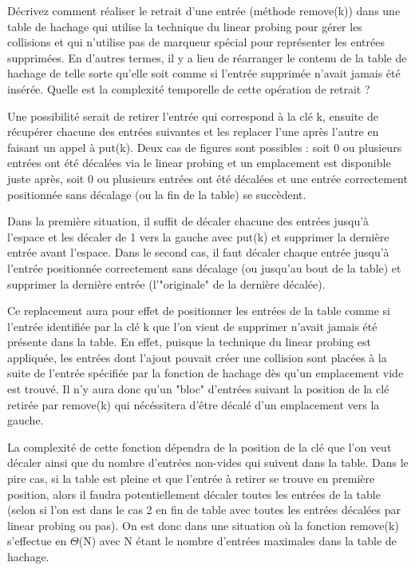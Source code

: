 Décrivez comment réaliser le retrait d’une entrée (méthode remove(k)) dans
une table de hachage qui utilise la technique du linear probing pour gérer les
collisions et qui n’utilise pas de marqueur spécial pour représenter les entrées
supprimées. En d’autres termes, il y a lieu de réarranger le contenu de la table de
hachage de telle sorte qu’elle soit comme si l’entrée supprimée n’avait jamais été
insérée. Quelle est la complexité temporelle de cette opération de retrait ?

Une possibilité serait de retirer l'entrée qui correspond à la clé k, ensuite de récupérer chacune des entrées suivantes et les replacer l'une après l'autre en faisant un appel à put(k).
Deux cas de figures sont possibles : soit 0 ou plusieurs entrées ont été décalées via le linear probing et un emplacement est disponible juste après, soit 0 ou plusieurs entrées ont été décalées et une entrée correctement positionnée sans décalage (ou la fin de la table) se succèdent.

Dans la première situation, il suffit de décaler chacune des entrées jusqu'à l'espace et les décaler de 1 vers la gauche avec put(k) et supprimer la dernière entrée avant l'espace. Dans le second cas, il faut décaler chaque entrée jusqu'à l'entrée positionnée correctement sans décalage (ou jusqu'au bout de la table) et supprimer la dernière entrée (l'"originale" de la dernière décalée).

Ce replacement aura pour effet de positionner les entrées de la table comme si l'entrée identifiée par la clé k que l'on vient de supprimer n'avait jamais été présente dans la table. En effet, puisque la technique du linear probing est appliquée, les entrées dont l'ajout pouvait créer une collision sont placées à la suite de l'entrée spécifiée par la fonction de hachage dès qu'un emplacement vide est trouvé. Il n'y aura donc qu'un "bloc" d'entrées suivant la position de la clé retirée par remove(k) qui nécéssitera d'être décalé d'un emplacement vers la gauche.

La complexité de cette fonction dépendra de la position de la clé que l'on veut décaler ainsi que du nombre d'entrées non-vides qui suivent dans la table. Dans le pire cas, si la table est pleine et que l'entrée à retirer se trouve en première position, alors il faudra potentiellement décaler toutes les entrées de la table (selon si l'on est dans le cas 2 en fin de table avec toutes les entrées décalées par linear probing ou pas). On est donc dans une situation où la fonction remove(k) s'effectue en $\Theta$(N) avec N étant le nombre d'entrées maximales dans la table de hachage.